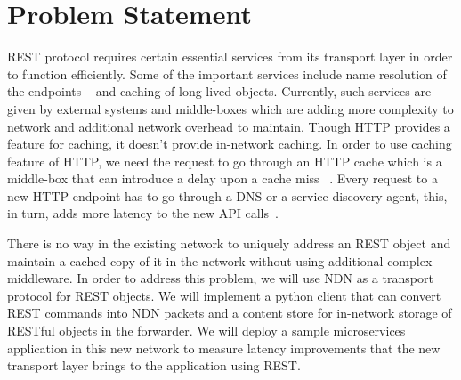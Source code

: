 \section{Problem Statement}
\label{motivation}


REST protocol requires certain essential services from its transport layer in order to function efficiently. Some of the important services include name resolution of the endpoints ~\cite{walfish2004untangling} and caching of long-lived objects. Currently, such services are given by external systems and middle-boxes which are adding more complexity to network and additional network overhead to maintain. Though HTTP provides a feature for caching, it doesn't provide in-network caching. In order to use caching feature of HTTP, we need the request to go through an HTTP cache which is a middle-box that can introduce a delay upon a cache miss ~\cite{fielding2002principled}. Every request to a new HTTP endpoint has to go through a DNS or a service discovery agent, this, in turn, adds more latency to the new API calls~\cite{walfish2004untangling}. 

There is no way in the existing network to uniquely address an REST object and maintain a cached copy of it in the network without using additional complex middleware. In order to address this problem, we will use NDN as a transport protocol for REST objects. We will implement a python client that can convert REST commands into NDN packets and a content store for in-network storage of RESTful objects in the forwarder. We will deploy a sample microservices application in this new network to measure latency improvements that the new transport layer brings to the application using REST.
